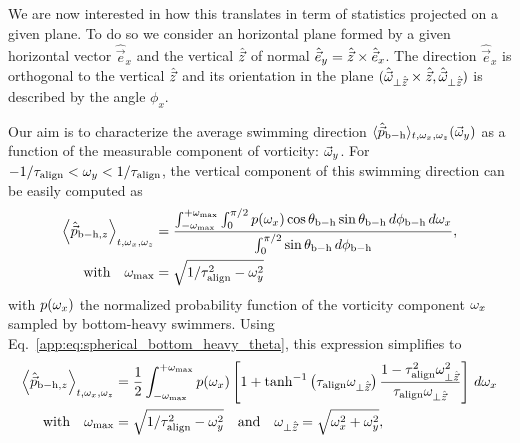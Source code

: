 We are now interested in how this translates in term of statistics projected on a given plane.
To do so we consider an horizontal plane formed by a given horizontal vector $\hat{\vec{e}}_x$ and the vertical $\hat{\vec{z}}$ of normal $\hat{\vec{e}}_{y} = \hat{\vec{z}} \times \hat{\vec{e}}_{x}$.
The direction $\hat{\vec{e}}_x$ is orthogonal to the vertical $\hat{\vec{z}}$ and
its orientation in the plane $(\hat{\vec{\omega}}_{\perp \hat{\vec{z}}} \times \hat{\vec{z}}, \hat{\vec{\omega}}_{\perp \hat{\vec{z}}})$ is described by the angle $\phi_{x}$.

Our aim is to characterize the average swimming direction $\langle \hat{\vec{p}}_{\mathrm{b-h}} \rangle_{t, \omega_x, \omega_z} (\vec{\omega}_y)$ as a function of the measurable component of vorticity: $\vec{\omega}_y$.
For $-1/\tau_{\mathrm{align}} < \omega_y < 1/\tau_{\mathrm{align}}$, the vertical component of this swimming direction can be easily computed as
\begin{subequations}
	\begin{align}
		\left\langle \hat{\vec{p}}_{\mathrm{b-h}, z} \right\rangle_{t, \omega_x, \omega_z} &= \frac{\int_{-\omega_{\max}}^{+\omega_{\max}} \int_0^{\pi/2} p(\omega_x) \cos \theta_{\mathrm{b-h}} \sin \theta_{\mathrm{b-h}} \, d \phi_{\mathrm{b-h}} \, d\omega_x}{\int_0^{\pi/2} \sin \theta_{\mathrm{b-h}} \, d \phi_{\mathrm{b-h}}},\\
		\text{with} \quad \omega_{\max} &= \sqrt{1/\tau_{\mathrm{align}}^2 - \omega_y^2}
	\end{align}
\end{subequations}
with $p(\omega_x)$ the normalized probability function of the vorticity component $\omega_x$ sampled by bottom-heavy swimmers.
Using Eq.~\eqref{app:eq:spherical_bottom_heavy_theta}, this expression simplifies to
\begin{subequations}
	\begin{align}
		\left\langle \hat{\vec{p}}_{\mathrm{b-h}, z} \right\rangle_{t, \omega_x, \omega_z} &= \frac{1}{2} \int_{-\omega_{\max}}^{+\omega_{\max}} p(\omega_x) \left[ 1 + \tanh^{-1} \left( \tau_{\mathrm{align}} \omega_{\perp \hat{\vec{z}}} \right) \frac{1 - \tau_{\mathrm{align}}^2 \omega_{\perp \hat{\vec{z}}}^2}{\tau_{\mathrm{align}} \omega_{\perp \hat{\vec{z}}}} \right]  \, d\omega_x\\
		\text{with} \quad \omega_{\max} &= \sqrt{1/\tau_{\mathrm{align}}^2 - \omega_y^2} \quad \text{and} \quad \omega_{\perp \hat{\vec{z}}} = \sqrt{\omega_{x}^2 + \omega_{y}^2},
	\end{align}
\end{subequations}
